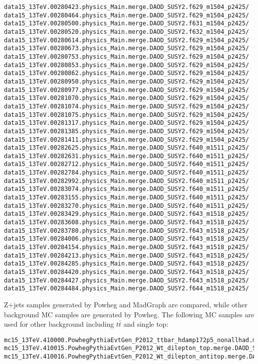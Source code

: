 \begin{verbatim}
data15_13TeV.00280423.physics_Main.merge.DAOD_SUSY2.f629_m1504_p2425/
data15_13TeV.00280464.physics_Main.merge.DAOD_SUSY2.f629_m1504_p2425/
data15_13TeV.00280500.physics_Main.merge.DAOD_SUSY2.f631_m1504_p2425/
data15_13TeV.00280520.physics_Main.merge.DAOD_SUSY2.f632_m1504_p2425/
data15_13TeV.00280614.physics_Main.merge.DAOD_SUSY2.f629_m1504_p2425/
data15_13TeV.00280673.physics_Main.merge.DAOD_SUSY2.f629_m1504_p2425/
data15_13TeV.00280753.physics_Main.merge.DAOD_SUSY2.f629_m1504_p2425/
data15_13TeV.00280853.physics_Main.merge.DAOD_SUSY2.f629_m1504_p2425/
data15_13TeV.00280862.physics_Main.merge.DAOD_SUSY2.f629_m1504_p2425/
data15_13TeV.00280950.physics_Main.merge.DAOD_SUSY2.f629_m1504_p2425/
data15_13TeV.00280977.physics_Main.merge.DAOD_SUSY2.f629_m1504_p2425/
data15_13TeV.00281070.physics_Main.merge.DAOD_SUSY2.f629_m1504_p2425/
data15_13TeV.00281074.physics_Main.merge.DAOD_SUSY2.f629_m1504_p2425/
data15_13TeV.00281075.physics_Main.merge.DAOD_SUSY2.f629_m1504_p2425/
data15_13TeV.00281317.physics_Main.merge.DAOD_SUSY2.f629_m1504_p2425/
data15_13TeV.00281385.physics_Main.merge.DAOD_SUSY2.f629_m1504_p2425/
data15_13TeV.00281411.physics_Main.merge.DAOD_SUSY2.f629_m1504_p2425/
data15_13TeV.00282625.physics_Main.merge.DAOD_SUSY2.f640_m1511_p2425/
data15_13TeV.00282631.physics_Main.merge.DAOD_SUSY2.f640_m1511_p2425/
data15_13TeV.00282712.physics_Main.merge.DAOD_SUSY2.f640_m1511_p2425/
data15_13TeV.00282784.physics_Main.merge.DAOD_SUSY2.f640_m1511_p2425/
data15_13TeV.00282992.physics_Main.merge.DAOD_SUSY2.f640_m1511_p2425/
data15_13TeV.00283074.physics_Main.merge.DAOD_SUSY2.f640_m1511_p2425/
data15_13TeV.00283155.physics_Main.merge.DAOD_SUSY2.f640_m1511_p2425/
data15_13TeV.00283270.physics_Main.merge.DAOD_SUSY2.f640_m1511_p2425/
data15_13TeV.00283429.physics_Main.merge.DAOD_SUSY2.f643_m1518_p2425/
data15_13TeV.00283608.physics_Main.merge.DAOD_SUSY2.f643_m1518_p2425/
data15_13TeV.00283780.physics_Main.merge.DAOD_SUSY2.f643_m1518_p2425/
data15_13TeV.00284006.physics_Main.merge.DAOD_SUSY2.f643_m1518_p2425/
data15_13TeV.00284154.physics_Main.merge.DAOD_SUSY2.f643_m1518_p2425/
data15_13TeV.00284213.physics_Main.merge.DAOD_SUSY2.f643_m1518_p2425/
data15_13TeV.00284285.physics_Main.merge.DAOD_SUSY2.f643_m1518_p2425/
data15_13TeV.00284420.physics_Main.merge.DAOD_SUSY2.f643_m1518_p2425/
data15_13TeV.00284427.physics_Main.merge.DAOD_SUSY2.f643_m1518_p2425/
data15_13TeV.00284484.physics_Main.merge.DAOD_SUSY2.f644_m1518_p2425/
\end{verbatim}
\normalsize

Z+jets samples generated by Powheg and MadGraph are compared, while other background MC samples are generated by Powheg.
The following MC samples are used for other background including $t\bar{t}$ and single top:
\scriptsize
\begin{verbatim}
mc15_13TeV.410000.PowhegPythiaEvtGen_P2012_ttbar_hdamp172p5_nonallhad.merge.DAOD_SUSY2.e3698_s2608_s2183_r6765_r6282_p2419/
mc15_13TeV.410015.PowhegPythiaEvtGen_P2012_Wt_dilepton_top.merge.DAOD_SUSY2.e3753_s2608_s2183_r6869_r6282_p2419/
mc15_13TeV.410016.PowhegPythiaEvtGen_P2012_Wt_dilepton_antitop.merge.DAOD_SUSY2.e3753_s2608_s2183_r6869_r6282_p2419/
\end{verbatim}
\normalsize

